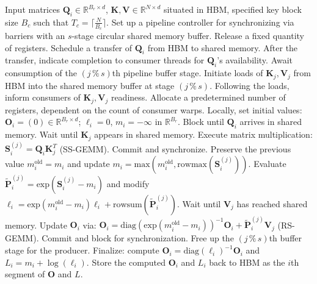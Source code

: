 \begin{algorithm}[H]
    \caption{\small\label{alg:flash3_wgmma_ws_only}\textsc{FlashAttention-3} forward pass \textbf{absent} intra-consumer overlap -- CTA view}
    \begin{algorithmic}[1]
\REQUIRE Input matrices $\mathbf{Q}_i \in \mathbb{R}^{B_r \times d}$, $\mathbf{K}, \mathbf{V} \in \mathbb{R}^{N \times d}$ situated in HBM, specified key block size $B_c$ such that $T_c = \lceil \frac{N}{B_c} \rceil$.
\STATE Set up a pipeline controller for synchronizing via barriers with an $s$-stage circular shared memory buffer.
\STATE Release a fixed quantity of registers.
\STATE Schedule a transfer of $\mathbf{Q}_i$ from HBM to shared memory.
\STATE After the transfer, indicate completion to consumer threads for $\mathbf{Q}_i$'s availability.
    \STATE Await consumption of the $(j\,\%\,s)$th pipeline buffer stage.
    \STATE Initiate loads of $\mathbf{K}_j, \mathbf{V}_j$ from HBM into the shared memory buffer at stage $(j\,\%\,s)$.
    \STATE Following the loads, inform consumers of $\mathbf{K}_j, \mathbf{V}_j$ readiness.
\ENDFOR
\ELSE \STATE Allocate a predetermined number of registers, dependent on the count of consumer warps.
\STATE Locally, set initial values: $\mathbf{O}_i = (0) \in \mathbb{R}^{B_r \times d}$; $\ell_i = 0$, $m_i = -\infty$ in $\mathbb{R}^{B_r}$.
\STATE Block until $\mathbf{Q}_i$ arrives in shared memory.
\STATE Wait until $\mathbf{K}_j$ appears in shared memory.
\STATE Execute matrix multiplication: $\mathbf{S}_i^{(j)} = \mathbf{Q}_i \mathbf{K}_j^T$ (SS-GEMM). Commit and synchronize. \label{alg:ws_only_gemm1}
\STATE Preserve the previous value $m_i^{\mathrm{old}} = m_i$ and update $m_i = \mathrm{max}(m_i^{\mathrm{old}}, \mathrm{rowmax}(\mathbf{S}_i^{(j)}))$. \label{code-ws:softmax_start}
\STATE Evaluate $\widetilde{\mathbf{P}}_i^{(j)} = \mathrm{exp}(\mathbf{S}_i^{(j)} - m_i)$ and modify $\ell_i = \mathrm{exp}(m_i^{\mathrm{old}} - m_i) \ell_i + \mathrm{rowsum}(\widetilde{\mathbf{P}}_i^{(j)})$. \label{code-ws:softmax_end}
\STATE Wait until $\mathbf{V}_j$ has reached shared memory.
\STATE Update $\mathbf{O}_i$ via: $\mathbf{O}_i = \mathrm{diag}(\mathrm{exp}(m_i^{\mathrm{old}} - m_i))^{-1} \mathbf{O}_i + \widetilde{\mathbf{P}}_i^{(j)} \mathbf{V}_j$ (RS-GEMM). Commit and block for synchronization. \label{alg:ws_only_gemm2}
\STATE Free up the $(j\,\%\,s)$th buffer stage for the producer.
\ENDFOR
\STATE Finalize: compute $\mathbf{O}_i = \mathrm{diag}(\ell_i)^{-1} \mathbf{O}_i$ and $L_i = m_i + \log(\ell_i)$.
\STATE Store the computed $\mathbf{O}_i$ and $L_i$ back to HBM as the $i$th segment of $\mathbf{O}$ and $L$.
\ENDIF
\end{algorithmic}
\end{algorithm}

